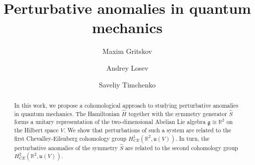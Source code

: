 \documentclass[10pt,a4paper]{amsart}
\theoremstyle{definition}
\begin{document}
\title[ 
Perturbative anomalies in quantum mechanics
]{Perturbative anomalies in quantum mechanics}

\begin{abstract}
In this work, we propose a cohomological approach to studying perturbative anomalies in quantum mechanics. The Hamiltonian $\hat{H}$ together with the symmetry generator $\hat{S}$ forms a unitary representation of the two-dimensional Abelian Lie algebra $\mathfrak{g}\cong \mathbb{R}^{2}$ on the Hilbert space $V$. We show that perturbations of such a system are related to the first Chevalley-Eilenberg cohomology group $H^{1}_{CE}(\mathbb{R}^{2},\mathfrak{u}(V))$. In turn, the perturbative anomalies of the symmetry $\hat{S}$ are related to the second cohomology group $H^{2}_{CE}(\mathbb{R}^{2},\mathfrak{u}(V))$. 
\end{abstract}

\author{Maxim Gritskov}
\address{Skolkovo Institute of Science and Technology, 121205, Moscow, Russia}
\address{Saint Petersburg State University,
Universitetskaya nab. 7/9, 199034 St. Petersburg, Russia}

\author{Andrey Losev}
\address{Shanghai Institute for Mathematics and Interdisciplinary Sciences, Building 3, 62 Weicheng Road, Yangpu District, 200433, Shanghai, China}

\author{Saveliy Timchenko}
\address{Faculty of Physics, National Research University Higher School of Economics, Staraya Basmannaya ul. 21/4s1, 105066, Moscow, Russia}

\maketitle

\setcounter{tocdepth}{3} 
\tableofcontents

\allowdisplaybreaks
\end{document}

